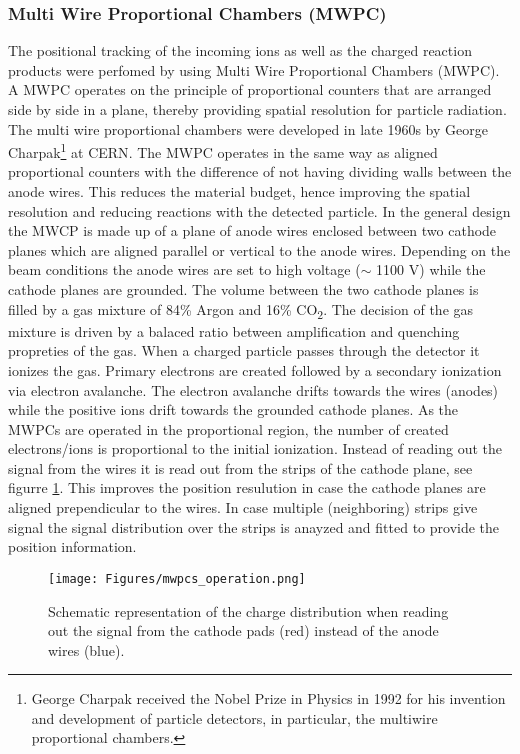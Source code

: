 \subsubsection{Multi Wire Proportional Chambers (MWPC)}\label{sec_mwpcs}
The positional tracking of the incoming ions as well as the charged reaction products were perfomed by using Multi Wire Proportional Chambers (MWPC). A MWPC operates on the principle of proportional counters that are arranged side by side in a plane, thereby providing spatial resolution for particle radiation. The multi wire proportional chambers were developed in late 1960s by George Charpak\footnote{George Charpak received the Nobel Prize in Physics in 1992 for his invention and development of particle detectors, in particular, the multiwire proportional chambers.} at CERN\cite{charpak1968use}.\newline
The MWPC operates in the same way as aligned proportional counters with the difference of not having dividing walls between the anode wires. This reduces the material budget, hence improving the spatial resolution and reducing reactions with the detected particle.\newline
In the general design the  MWCP is made up of a plane of anode wires enclosed between two cathode planes which are aligned parallel or vertical to the anode wires. Depending on the beam conditions the anode wires are set to high voltage ($\sim$ 1100 V) while the cathode planes are grounded.\newline
The volume between the two cathode planes is filled by a gas mixture of 84\% Argon and 16\% CO\textsubscript{2}. The decision of the gas mixture is driven by a balaced ratio between amplification and quenching propreties of the gas.\newline
When a charged particle passes through the detector it ionizes the gas. Primary electrons are created followed by a secondary ionization via electron avalanche. The electron avalanche drifts towards the wires (anodes) while the positive ions drift towards the grounded cathode planes. As the MWPCs are operated in the proportional region, the number of created electrons/ions is proportional to the initial ionization. Instead of reading out the signal from the wires it is read out from the strips of the cathode plane, see figurre \ref{fig:mwpcs_operation}. This improves the position resulution in case the cathode planes are aligned prependicular to the wires. In case multiple (neighboring) strips give signal the signal distribution over the strips is anayzed and fitted to provide the position information.\newline
\begin{figure}[htpb]
    \centering
    \texttt{[image: Figures/mwpcs\_operation.png]}
    \caption{
    Schematic representation of the charge distribution when reading out the signal from the cathode pads (red) instead of the anode wires (blue).
    } 
    \label{fig:mwpcs_operation}
\end{figure}

